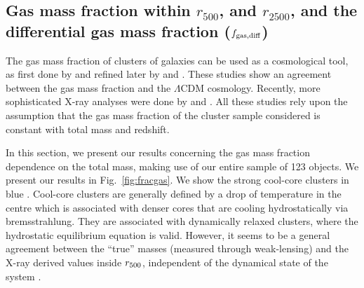 \documentclass{aa}
\begin{document}
  
\subsection{Gas mass fraction within $r_{500}$, and $r_{2500}$, and 
the differential gas mass fraction ($f_{\rm gas, diff}$)}
\label{fracgas}

The gas mass fraction of clusters of galaxies can be used as a
  cosmological tool, as first done by \citet{allen02} and refined
  later by \citet{allen04} and \citet{allen08}. These studies show an
  agreement between the gas mass fraction and the $\Lambda$CDM
  cosmology. Recently, more sophisticated X-ray analyses were
  done by \citet{ettori09} and \citet{mantz10}.  All these studies
  rely upon the assumption that the gas mass fraction of the cluster
  sample considered is constant with total mass and redshift.

In this section, we present our results concerning  
the gas mass fraction dependence on the total mass, making use of our entire sample
of 123 objects.  We present our results in Fig.~\ref{fig:fracgas}. We
show the strong cool-core clusters in blue \citep[RCC is defined
in][these are the most relaxed clusters in the sample]{M12}.
Cool-core clusters are generally defined by a drop of
temperature in the centre which is associated with denser cores that
are cooling hydrostatically via bremsstrahlung.  They are associated with
dynamically relaxed clusters, where the hydrostatic equilibrium
equation is valid. However, it seems to be a general agreement 
between the ``true'' masses (measured through weak-lensing) and the
X-ray derived values inside  $r_{\rm 500}$, independent of the dynamical state of the system
 \citep{zhang10}.
 
\end{document}
